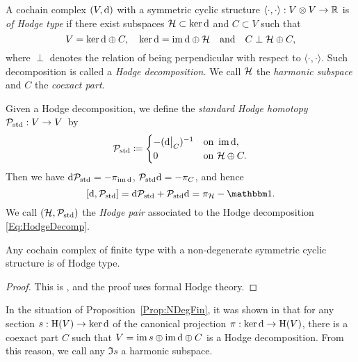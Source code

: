 \documentclass[\MainFolder/Text.tex]{subfiles}
\begin{document}
\begin{Definition}\label{Def:HodgeDecomp}
A cochain complex $(V,\mathrm{d})$ with a symmetric cyclic structure $\langle\cdot,\cdot\rangle: V\otimes V \rightarrow \mathbb{R}$ is \emph{of Hodge type} if there exist subspaces $\mathcal{H} \subset \operatorname{ker} \mathrm{d}$ and $C\subset V$ such that 
\begin{equation}\label{Eq:HodgeDecomp}
V = \operatorname{ker} \mathrm{d} \oplus C, \quad \operatorname{ker} \mathrm{d} = \operatorname{im} \mathrm{d} \oplus \mathcal{H}\quad\text{and}\quad C \perp \mathcal{H} \oplus C,
\end{equation}
where $\perp$ denotes the relation of being perpendicular with respect to $\langle\cdot,\cdot\rangle$. Such decomposition is called a \emph{Hodge decomposition.} We call $\mathcal{H}$ the \emph{harmonic subspace} and $C$ the \emph{coexact part}.

Given a Hodge decomposition, we define the \emph{standard Hodge homotopy} $\mathcal{P}_{\mathrm{std}}: V \rightarrow V$~by 
$$\HtpStd \coloneqq \begin{cases}
    -(\Restr{\Dd}{C})^{-1} & \text{on }\Im \Dd, \\
    0 & \text{on } \Harm \oplus C.
   \end{cases}$$
Then we have $\mathrm{d} \mathcal{P}_{\mathrm{std}} = - \pi_{\operatorname{im} \mathrm{d}}$, $\mathcal{P}_{\mathrm{std}} \mathrm{d} = -\pi_{C}$, and hence 
$$ [\Dd,\HtpStd] = \Dd \HtpStd + \HtpStd \Dd = \pi_\Harm - \Id.$$
 We call $(\mathcal{H},\mathcal{P}_{\mathrm{std}})$ the \emph{Hodge pair} associated to the Hodge decomposition \eqref{Eq:HodgeDecomp}.
\end{Definition}

\begin{Proposition}\label{Prop:NDegFin}
Any cochain complex of finite type with a non-degenerate symmetric cyclic structure is of Hodge type.
\end{Proposition}
\begin{proof}
This is \cite[Lemma~11.1]{Cieliebak2015}, and the proof uses formal Hodge theory.
\end{proof}

\begin{Remark}\label{Rem:RemarkHarm}
In the situation of Proposition~\ref{Prop:NDegFin}, it was shown in \cite[Remark~2.6]{Van2019} that for any section $s: \mathrm{H}(V)\rightarrow \operatorname{ker}\mathrm{d}$ of the canonical projection $\pi: \operatorname{ker} \mathrm{d} \rightarrow \mathrm{H}(V)$, there is a coexact part $C$ such that $V=\operatorname{im} s \oplus \operatorname{im} \mathrm{d} \oplus C$ is a Hodge decomposition. From this reason, we call any $\Im s$ a harmonic subspace.
\end{Remark}
\end{document}
